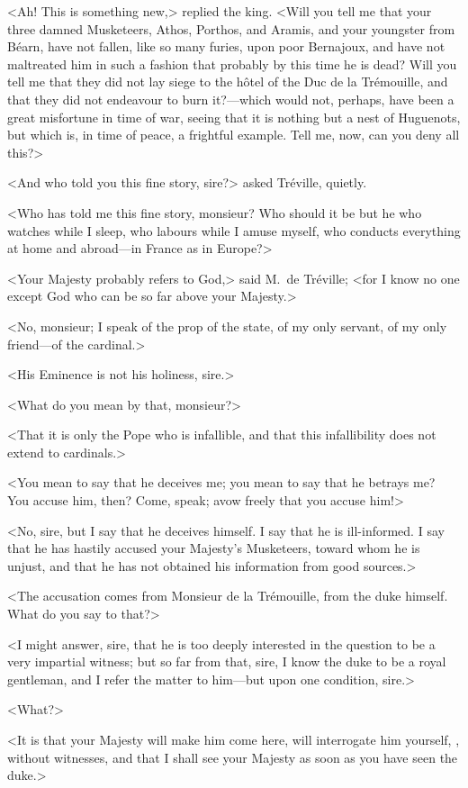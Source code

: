 <Ah! This is something new,> replied the king. <Will you tell me that your three damned Musketeers, Athos, Porthos, and Aramis, and your youngster from Béarn, have not fallen, like so many furies, upon poor Bernajoux, and have not maltreated him in such a fashion that probably by this time he is dead? Will you tell me that they did not lay siege to the hôtel of the Duc de la Trémouille, and that they did not endeavour to burn it?—which would not, perhaps, have been a great misfortune in time of war, seeing that it is nothing but a nest of Huguenots, but which is, in time of peace, a frightful example. Tell me, now, can you deny all this?> 

<And who told you this fine story, sire?> asked Tréville, quietly. 

<Who has told me this fine story, monsieur? Who should it be but he who watches while I sleep, who labours while I amuse myself, who conducts everything at home and abroad—in France as in Europe?> 

<Your Majesty probably refers to God,> said M.~de Tréville; <for I know no one except God who can be so far above your Majesty.> 

<No, monsieur; I speak of the prop of the state, of my only servant, of my only friend—of the cardinal.> 

<His Eminence is not his holiness, sire.> 

<What do you mean by that, monsieur?> 

<That it is only the Pope who is infallible, and that this infallibility does not extend to cardinals.> 

<You mean to say that he deceives me; you mean to say that he betrays me? You accuse him, then? Come, speak; avow freely that you accuse him!> 

<No, sire, but I say that he deceives himself. I say that he is ill-informed. I say that he has hastily accused your Majesty's Musketeers, toward whom he is unjust, and that he has not obtained his information from good sources.> 

<The accusation comes from Monsieur de la Trémouille, from the duke himself. What do you say to that?> 

<I might answer, sire, that he is too deeply interested in the question to be a very impartial witness; but so far from that, sire, I know the duke to be a royal gentleman, and I refer the matter to him—but upon one condition, sire.> 

<What?> 

<It is that your Majesty will make him come here, will interrogate him yourself, , without witnesses, and that I shall see your Majesty as soon as you have seen the duke.> 

